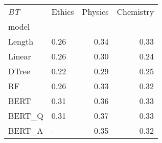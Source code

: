\begin{tabular}{llrr}
\toprule
\textit{BT} & Ethics &  Physics &  Chemistry \\
model  &        &          &            \\
\midrule
Length &   0.26 &     0.34 &       0.33 \\
Linear &   0.26 &     0.30 &       0.24 \\
DTree  &   0.22 &     0.29 &       0.25 \\
RF     &   0.26 &     0.33 &       0.32 \\
BERT   &   0.31 &     0.36 &       0.33 \\
BERT\_Q &   0.31 &     0.37 &       0.33 \\
BERT\_A &      - &     0.35 &       0.32 \\
\bottomrule
\end{tabular}
